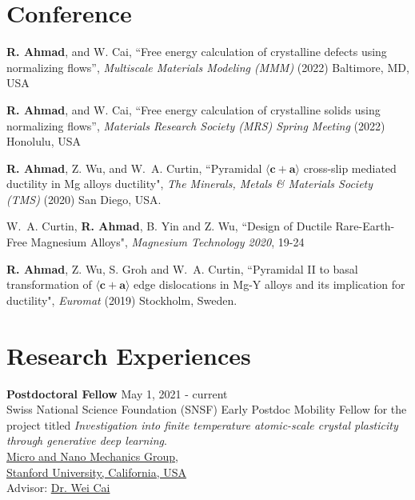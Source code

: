 \documentclass[margin,line]{resume}
\begin{document}
\begin{resume}
    \clearpage
    \section{\mysidestyle Conference}

    \textbf{R. Ahmad}, and W. Cai, ``Free energy calculation of crystalline defects using normalizing flows'', \textit{Multiscale Materials Modeling (MMM)} (2022) Baltimore, MD, USA

    \textbf{R. Ahmad}, and W. Cai, ``Free energy calculation of crystalline solids using normalizing flows'', \textit{Materials Research Society (MRS) Spring Meeting} (2022) Honolulu, USA

    \textbf{R. Ahmad}, Z. Wu, and W.~A. Curtin, ``Pyramidal $\langle \boldsymbol{c} + \boldsymbol{a} \rangle$ cross-slip mediated ductility in Mg alloys ductility", \textit{The Minerals, Metals \& Materials Society (TMS)} (2020) San Diego, USA.

    W.~A. Curtin, \textbf{R. Ahmad}, B. Yin and Z. Wu, ``Design of Ductile Rare-Earth-Free Magnesium Alloys", \textit{Magnesium Technology 2020}, 19-24

    \textbf{R. Ahmad}, Z. Wu, S. Groh and W.~A. Curtin, ``Pyramidal II to basal transformation of $\langle
        \boldsymbol{c} + \boldsymbol{a} \rangle$ edge dislocations in Mg-Y alloys and its implication for
    ductility", \textit{Euromat} (2019) Stockholm, Sweden.


    \section{\mysidestyle Research Experiences}
    \textbf{\textsf{Postdoctoral Fellow}}    \hfill  \small{May 1, 2021 - current} \\
    Swiss National Science Foundation (SNSF) Early Postdoc Mobility Fellow for the project titled \textit{Investigation into finite temperature atomic-scale crystal plasticity through generative deep learning}.\\
    \href{https://micronano.stanford.edu/}{Micro and Nano Mechanics Group}, \\
    \href{https://www.stanford.edu/}{Stanford University, California, USA}\\
    Advisor:  \href{https://web.stanford.edu/~caiwei/}{Dr. Wei Cai}



\end{resume}
\end{document}
